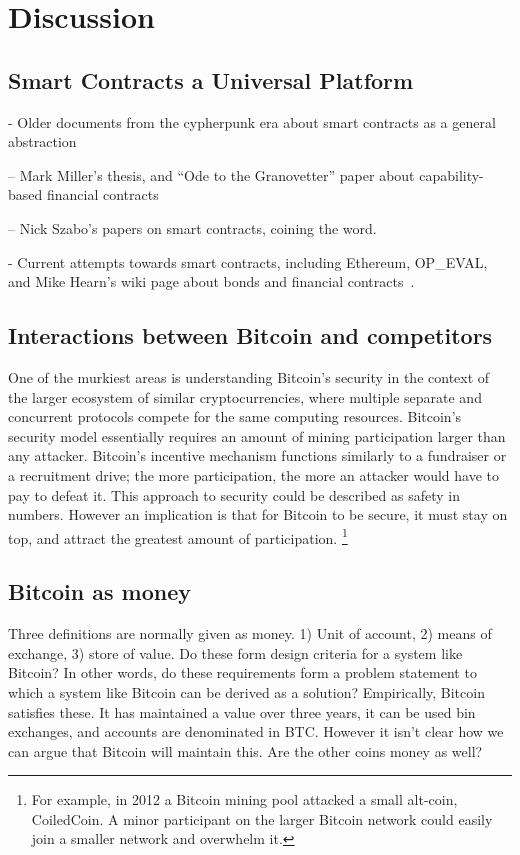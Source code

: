 \section{Discussion}

\subsection{Smart Contracts a Universal Platform}
- Older documents from the cypherpunk era about smart contracts as a general abstraction

-- Mark Miller's thesis, and ``Ode to the Granovetter'' paper about capability-based financial contracts \cite{miller2001capability}

-- Nick Szabo's papers on smart contracts, coining the word. \cite{szabo1997formalizing}

- Current attempts towards smart contracts, including Ethereum, OP\_EVAL, and Mike Hearn's wiki page about bonds and financial contracts~\cite{bitcointalk-bondmarkets}.

\subsection{Interactions between Bitcoin and competitors}
One of the murkiest areas is understanding Bitcoin's security in the context of the larger ecosystem of similar cryptocurrencies, where multiple separate and concurrent protocols compete for the same computing resources. Bitcoin's security model essentially requires an amount of mining participation larger than any attacker. Bitcoin's incentive mechanism functions similarly to a fundraiser or a recruitment drive; the more participation, the more an attacker would have to pay to defeat it. This approach to security could be described as safety in numbers. However an implication is that for Bitcoin to be secure, it must stay on top, and attract the greatest amount of participation. \footnote{For example, in 2012 a Bitcoin mining pool attacked a small alt-coin, CoiledCoin. A minor participant on the larger Bitcoin network could easily join a smaller network and overwhelm it. }


\subsection{Bitcoin as money}
Three definitions are normally given as money. 1) Unit of account, 2) means of exchange, 3) store of value. Do these form design criteria for a system like Bitcoin? In other words, do these requirements form a problem statement to which a system like Bitcoin can be derived as a solution? Empirically, Bitcoin satisfies these. It has maintained a value over three years, it can be used bin exchanges, and accounts are denominated in BTC. However it isn't clear how we can argue that Bitcoin will maintain this. Are the other coins money as well?

